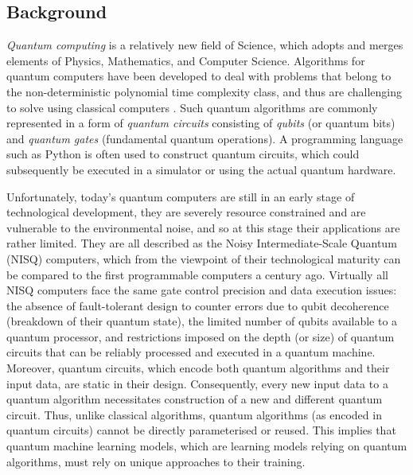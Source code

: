 \subsection{Background}\label{Background Section}
\emph{Quantum computing} is a relatively new field of Science, which adopts and merges elements of Physics, Mathematics, and Computer Science. 
Algorithms for quantum computers have been developed to deal with problems that belong to the non-deterministic polynomial time complexity class, and thus are challenging to solve using classical computers \cite{williamsSolvingNPCompleteProblems2011,jiangQuantumAnnealingPrime2018,farhiQuantumApproximateOptimization2014}. 
Such quantum algorithms are commonly represented in a form of \emph{quantum circuits} consisting of \emph{qubits} (or quantum bits) and \emph{quantum gates} (fundamental quantum operations). A programming language such as Python is often used to construct quantum circuits, which could subsequently be executed in a simulator or using the actual quantum hardware. 

Unfortunately, today's quantum computers are still in an early stage of technological development, they are severely resource constrained and are vulnerable to the environmental noise, and so at this stage their applications are rather limited. 
They are all described as the Noisy Intermediate-Scale Quantum (NISQ) \cite{brooksQuantumSupremacyHunt2019} computers, which from the viewpoint of their technological maturity can be compared to the first programmable computers a century ago. 
Virtually all NISQ computers face the same gate control precision and data execution issues: the absence of fault-tolerant design to counter errors due to qubit decoherence (breakdown of their quantum state), the limited number of qubits available to a quantum processor, and restrictions imposed on the depth (or size) of quantum circuits that can be reliably processed and executed in a quantum machine. 
Moreover, quantum circuits, which encode both quantum algorithms and their input data, are static in their design. 
Consequently, every new input data to a quantum algorithm necessitates construction of a new and different quantum circuit. 
Thus, unlike classical algorithms, quantum algorithms (as encoded in quantum circuits) cannot be directly parameterised or reused. This implies that quantum machine learning models, which are learning models relying on quantum algorithms, must rely on unique approaches to their training.

